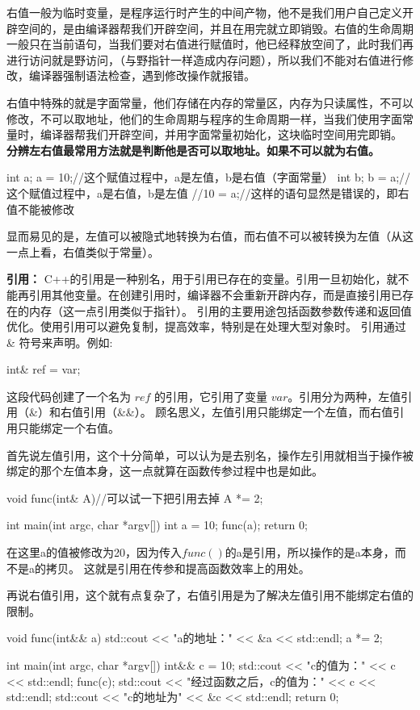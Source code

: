 右值一般为临时变量，是程序运行时产生的中间产物，他不是我们用户自己定义开辟空间的，是由编译器帮我们开辟空间，并且在用完就立即销毁。右值的生命周期一般只在当前语句，当我们要对右值进行赋值时，他已经释放空间了，此时我们再进行访问就是野访问，（与野指针一样造成内存问题），所以我们不能对右值进行修改，编译器强制语法检查，遇到修改操作就报错。

右值中特殊的就是字面常量，他们存储在内存的常量区，内存为只读属性，不可以修改，不可以取地址，他们的生命周期与程序的生命周期一样，当我们使用字面常量时，编译器帮我们开辟空间，并用字面常量初始化，这块临时空间用完即销。
\textbf{分辨左右值最常用方法就是判断他是否可以取地址。如果不可以就为右值。}
\begin{tcode}
int a;
a = 10;//这个赋值过程中，a是左值，b是右值（字面常量）
int b;
b = a;//这个赋值过程中，a是右值，b是左值
//10 = a;//这样的语句显然是错误的，即右值不能被修改
\end{tcode}
显而易见的是，左值可以被隐式地转换为右值，而右值不可以被转换为左值（从这一点上看，右值类似于常量）。

\textbf{引用：}
C++的引用是一种别名，用于引用已存在的变量。引用一旦初始化，就不能再引用其他变量。在创建引用时，编译器不会重新开辟内存，而是直接引用已存在的内存（这一点引用类似于指针）。
引用的主要用途包括函数参数传递和返回值优化。使用引用可以避免复制，提高效率，特别是在处理大型对象时。
引用通过 \& 符号来声明。例如:
\begin{tcode}
int& ref = var;
\end{tcode}
这段代码创建了一个名为 $ref$ 的引用，它引用了变量 $var$。引用分为两种，左值引用（\&）和右值引用（\&\&）。
顾名思义，左值引用只能绑定一个左值，而右值引用只能绑定一个右值。

首先说左值引用，这个十分简单，可以认为是去别名，操作左引用就相当于操作被绑定的那个左值本身，这一点就算在函数传参过程中也是如此。
\begin{tcode}
void func(int& A){//可以试一下把引用去掉
    A *= 2;
}

int main(int argc, char *argv[]) {
    int a = 10;
    func(a);
    return 0;
}
\end{tcode}
在这里a的值被修改为20，因为传入$func()$的a是引用，所以操作的是a本身，而不是a的拷贝。
这就是引用在传参和提高函数效率上的用处。

再说右值引用，这个就有点复杂了，右值引用是为了解决左值引用不能绑定右值的限制。
\begin{tcode}
void func(int&& a){
    std::cout << "a的地址：" << &a << std::endl;
    a *= 2;
}

int main(int argc, char *argv[]) {
    int&& c = 10;
    std::cout << "c的值为：" << c << std::endl;
    func(c);
    std::cout << "经过函数之后，c的值为：" << c << std::endl;
    std::cout << "c的地址为" << &c << std::endl;
    return 0;
}
\end{tcode}

